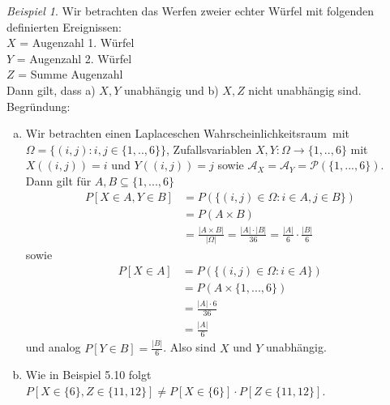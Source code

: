 \documentclass[a4paper,12pt,fleqn]{scrartcl}
\newcommand{\m}[1]{\mathcal{ #1 }}
\newcommand{\WR}{Wahrscheinlichkeitsraum}
\theoremstyle{definition}
\theoremstyle{plain}
\theoremstyle{remark}
\newtheorem{beispiel}[definition]{Beispiel}
\begin{document}
\begin{beispiel}
Wir betrachten das Werfen zweier echter Würfel mit folgenden definierten Ereignissen: \\
$X$ = \glqq Augenzahl 1. Würfel\grqq \\
$Y$ = \glqq Augenzahl 2. Würfel\grqq \\
$Z$ = \glqq Summe Augenzahl\grqq \\
Dann gilt, dass a) $X, Y$ unabhängig und b) $X, Z$ nicht unabhängig sind.\\
Begründung: 
\begin{enumerate}[a)]
\item Wir betrachten einen Laplaceschen \WR \, mit $ \Omega = \{ ( i,j) : i,j \in \{ 1,..,6 \} \}$, Zufallsvariablen $X, Y: \Omega \rightarrow \{ 1,..,6 \}$ mit $X((i,j)) = i$ und $Y((i,j))=j$ sowie $\m{A}_X = \m{A}_Y = \m{P}( \{ 1,...,6 \} )$. \\
Dann gilt für $A, B \subseteq \{1,...,6 \} $
\begin{align*}
P[X \in A , Y \in B] &= P( \{ (i,j) \in \Omega : i \in A , j \in B \} ) \\
&= P( A \times B ) \\
&= \frac{| A \times B |}{| \Omega  |} = \frac{|A| \cdot |B|}{36} = \frac{|A|}{6} \cdot \frac{|B|}{6}
\end{align*} 
sowie 
\begin{align*}
P[X \in A] &= P( \{ (i,j) \in \Omega : i \in A \}) \\
&= P( A \times \{ 1,...,6 \} ) \\
&= \frac{|A| \cdot 6}{36} \\
&= \frac{|A|}{6}
\end{align*}
und analog $P[Y \in B] = \frac{|B|}{6}$. Also sind $X$ und $Y$ unabhängig.
\item Wie in Beispiel 5.10 folgt $P[ X \in \{ 6 \} , Z \in \{ 11 , 12 \} ] \neq P[X \in \{ 6 \} ] \cdot P[Z \in \{ 11 , 12 \} ]$.
\end{enumerate}
\end{beispiel}
\end{document}
